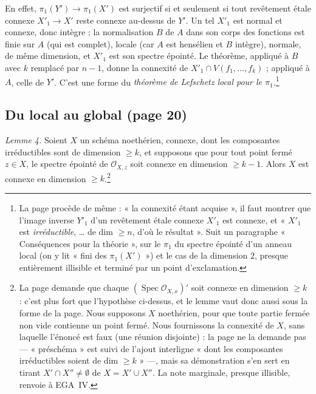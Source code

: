 \documentclass[11pt,a4paper]{article}
\begin{document}
En effet, $\pi_1(Y') \to \pi_1(X')$ est surjectif si et seulement si tout
revêtement étale connexe $X'_1 \to X'$ reste connexe au-dessus de $Y'$. Un tel
$X'_1$ est normal et connexe, donc intègre ; la normalisation $B$ de $A$ dans
son corps des fonctions est finie sur $A$ (qui est complet), locale (car $A$
est hensélien et $B$ intègre), normale, de même dimension, et $X'_1$ est son
spectre épointé. Le théorème, appliqué à $B$ avec $k$ remplacé par $n-1$,
donne la connexité de $X'_1 \cap V(f_1, \ldots, f_k)$ ; appliqué à $A$, celle
de $Y'$. C'est une forme du \emph{théorème de Lefschetz local pour le
$\pi_1$}.\footnote{La page procède de même : « la connexité étant acquise »,
il faut montrer que l'image inverse $Y'_1$ d'un revêtement étale connexe
$X'_1$ est connexe, et « $X'_1$ est \emph{irréductible}, … de dim
$\geq n$, d'où le résultat ». Suit un paragraphe « Conséquences pour la
théorie », sur le $\pi_1$ du spectre épointé d'un anneau local (on y lit « fini
des $\pi_1(X')$ ») et le cas de la dimension $2$, presque entièrement
illisible et terminé par un point d'exclamation.}

\subsection*{Du local au global (page 20)}

\emph{Lemme 4.} Soient $X$ un schéma noethérien, connexe, dont les
composantes irréductibles sont de dimension $\geq k$, et supposons que pour
tout point fermé $z \in X$, le spectre épointé de $\mathcal{O}_{X,z}$ soit
connexe en dimension $\geq k - 1$. Alors $X$ est connexe en dimension
$\geq k$.\footnote{La page demande que chaque
$(\operatorname{Spec} \mathcal{O}_{X,x})'$ soit connexe en dimension $\geq k$ :
c'est plus fort que l'hypothèse ci-dessus, et le lemme vaut donc aussi sous la
forme de la page. Nous supposons $X$ noethérien, pour que toute partie fermée
non vide contienne un point fermé. Nous fournissons la connexité de $X$, sans laquelle
l'énoncé est faux (une réunion disjointe) : la page ne la demande pas
--- « préschéma » est suivi de l'ajout interligne « dont les composantes
irréductibles soient de dim $\geq k$ » ---, mais sa démonstration s'en sert
en tirant $X' \cap X'' \neq \emptyset$ de $X = X' \cup X''$. La note
marginale, presque illisible, renvoie à EGA~IV.}
\end{document}
